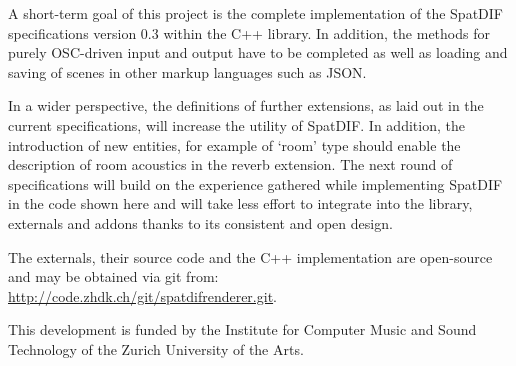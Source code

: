\documentclass{article}
\begin{document}
A short-term goal of this project is the complete implementation of the SpatDIF specifications version 0.3 \cite{SpatDIF_03} within the C++ library.
In addition, the methods for purely OSC-driven input and output have to be completed as well as loading and saving of scenes in other markup languages such as JSON.

In a wider perspective, the definitions of further extensions, as laid out in the current specifications, will increase the utility of SpatDIF.
In addition, the introduction of new entities, for example of `room' type should enable the description of room acoustics in the reverb extension.
The next round of specifications will build on the experience gathered while implementing SpatDIF in the code shown here and will take less effort to integrate into the library, externals and addons thanks to its consistent and open design.

The externals, their source code and the C++ implementation are open-source and may be obtained via git from:\\ \footnotesize\url{http://code.zhdk.ch/git/spatdifrenderer.git}.\normalsize


\begin{acknowledgments}
This development is funded by the Institute for Computer Music and Sound Technology of the Zurich University of the Arts.
\end{acknowledgments} 

\printbibliography
\end{document}

